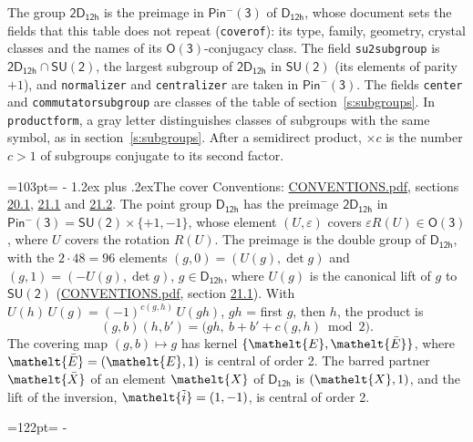 \documentclass[10pt,a4paper]{article}
\makeatletter
\renewcommand\section{\@startsection{section}{1}{\z@}{-3ex plus -1ex minus -.2ex}%
  {1.2ex plus .2ex}{\normalfont\large\sffamily\bfseries\color{parttitle}}}
\newcommand{\needspace}[1]{\par\penalty-100\begingroup\dimen0=#1\relax\dimen2=\pagegoal
  \advance\dimen2-\pagetotal\ifdim\dimen0>\dimen2\relax\ifdim\dimen2>0pt\vfil\break\fi\fi
  \endgroup}
\numberwithin{equation}{section}
\newcommand{\eltfont}[1]{{\let\sigma\eltsigma\mathelt{#1}}}
\newcommand{\grp}[1]{\mathsf{#1}}
\newcommand{\elt}[1]{\eltfont{#1}}
\newcommand{\dirprod}{\times}
\newcommand{\barred}[1]{\bar{#1}}
\newcommand{\lift}[1]{\tilde{#1}}
\makeatother
\begin{document}
\leavevmode\label{n:element.inversion}\label{n:group.preimage}The group $\grp{2D_{12h}}$ is the preimage in $\grp{Pin^{-}(3)}$ of \href{../../../rotation/data/pdf/D12h.pdf}{$\grp{D_{12h}}$}, whose document sets the fields that this table does not repeat (\texttt{coverof}): its type, family, geometry, crystal classes and the names of its \href{../../../rotation/data/pdf/O3.pdf}{$\grp{O(3)}$}-conjugacy class. The field \texttt{su2subgroup} is $\grp{2D_{12h}} \cap \grp{SU(2)}$, the largest subgroup of $\grp{2D_{12h}}$ in $\grp{SU(2)}$ (its elements of parity $+1$), and \texttt{normalizer} and \texttt{centralizer} are taken in $\grp{Pin^{-}(3)}$. The fields \texttt{center} and \texttt{commutatorsubgroup} are classes of the table of section~\ref{s:subgroups}.
In \texttt{productform}, a gray letter distinguishes classes of subgroups with the same symbol, as in section~\ref{s:subgroups}. \label{n:index.conjugates.c}After a semidirect product, ${\times}c$ is the number $c > 1$ of subgroups conjugate to its second factor.
\needspace{103pt}
\section{The cover}\label{s:cover}
Conventions: \href{../../CONVENTIONS.pdf}{CONVENTIONS.pdf}, sections \href{../../CONVENTIONS.pdf\#conv.20.1}{20.1}, \href{../../CONVENTIONS.pdf\#conv.21.1}{21.1} and \href{../../CONVENTIONS.pdf\#conv.21.2}{21.2}.
\leavevmode\label{n:group.pin.minus}\label{n:group.su2}\label{n:local.pin.sign}\label{n:matrix.covered}\label{n:matrix.lift.su2}\label{n:index.bar}The point group $\grp{D_{12h}}$ has the preimage $\grp{2D_{12h}}$ in $\grp{Pin^{-}(3)} = \grp{SU(2)} \dirprod \{+1, -1\}$, whose element $(U, \varepsilon)$ covers $\varepsilon R(U) \in \grp{O(3)}$, where $U$ covers the rotation $R(U)$. The preimage is the double group of $\grp{D_{12h}}$, with the $2 \cdot 48 = 96$ elements $(g, 0) = (U(g), \det g)$ and $(g, 1) = (-U(g), \det g)$, $g \in \grp{D_{12h}}$, where $U(g)$ is the canonical lift of $g$ to $\grp{SU(2)}$ (\href{../../CONVENTIONS.pdf}{CONVENTIONS.pdf}, section \href{../../CONVENTIONS.pdf\#conv.21.1}{21.1}). \label{n:function.cocycle}With $U(h)\,U(g) = (-1)^{c(g,h)}\,U(gh)$, $gh$ = first $g$, then $h$, the product is
\begin{equation}\label{e:product}(g, b)(h, b') = \bigl(gh,\ b + b' + c(g, h) \bmod 2\bigr).\end{equation}
\leavevmode\label{n:mark.bar}The covering map $(g, b) \mapsto g$ has kernel $\{\elt{E}, \elt{\barred{E}}\}$, where $\elt{\barred{E}} = (\elt{E}, 1)$ is central of order 2. \label{n:element.named}\label{n:mark.lift}The barred partner $\elt{\barred{X}}$ of an element $\elt{X}$ of $\grp{D_{12h}}$ is $(\elt{X}, 1)$, and the lift of the inversion, $\elt{\lift{i}} = (1, -1)$, is central of order 2.
\needspace{122pt}
\end{document}
